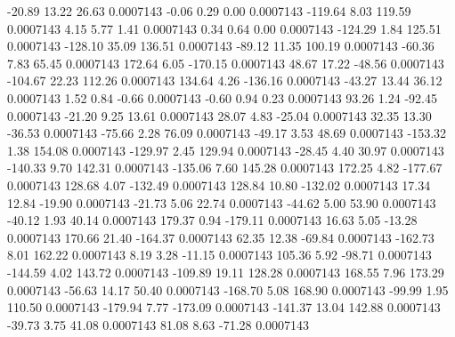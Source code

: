       -20.89       13.22       26.63     0.0007143
       -0.06        0.29        0.00     0.0007143
     -119.64        8.03      119.59     0.0007143
        4.15        5.77        1.41     0.0007143
        0.34        0.64        0.00     0.0007143
     -124.29        1.84      125.51     0.0007143
     -128.10       35.09      136.51     0.0007143
      -89.12       11.35      100.19     0.0007143
      -60.36        7.83       65.45     0.0007143
      172.64        6.05     -170.15     0.0007143
       48.67       17.22      -48.56     0.0007143
     -104.67       22.23      112.26     0.0007143
      134.64        4.26     -136.16     0.0007143
      -43.27       13.44       36.12     0.0007143
        1.52        0.84       -0.66     0.0007143
       -0.60        0.94        0.23     0.0007143
       93.26        1.24      -92.45     0.0007143
      -21.20        9.25       13.61     0.0007143
       28.07        4.83      -25.04     0.0007143
       32.35       13.30      -36.53     0.0007143
      -75.66        2.28       76.09     0.0007143
      -49.17        3.53       48.69     0.0007143
     -153.32        1.38      154.08     0.0007143
     -129.97        2.45      129.94     0.0007143
      -28.45        4.40       30.97     0.0007143
     -140.33        9.70      142.31     0.0007143
     -135.06        7.60      145.28     0.0007143
      172.25        4.82     -177.67     0.0007143
      128.68        4.07     -132.49     0.0007143
      128.84       10.80     -132.02     0.0007143
       17.34       12.84      -19.90     0.0007143
      -21.73        5.06       22.74     0.0007143
      -44.62        5.00       53.90     0.0007143
      -40.12        1.93       40.14     0.0007143
      179.37        0.94     -179.11     0.0007143
       16.63        5.05      -13.28     0.0007143
      170.66       21.40     -164.37     0.0007143
       62.35       12.38      -69.84     0.0007143
     -162.73        8.01      162.22     0.0007143
        8.19        3.28      -11.15     0.0007143
      105.36        5.92      -98.71     0.0007143
     -144.59        4.02      143.72     0.0007143
     -109.89       19.11      128.28     0.0007143
      168.55        7.96      173.29     0.0007143
      -56.63       14.17       50.40     0.0007143
     -168.70        5.08      168.90     0.0007143
      -99.99        1.95      110.50     0.0007143
     -179.94        7.77     -173.09     0.0007143
     -141.37       13.04      142.88     0.0007143
      -39.73        3.75       41.08     0.0007143
       81.08        8.63      -71.28     0.0007143
